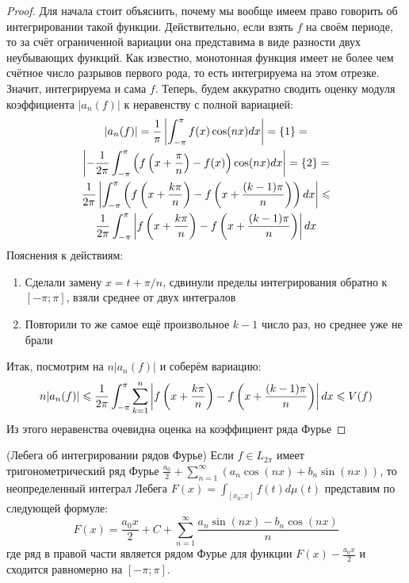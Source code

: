 \begin{proof}
	Для начала стоит объяснить, почему мы вообще имеем право говорить об интегрировании такой функции. Действительно, если взять $f$ на своём периоде, то за счёт ограниченной вариации она представима в виде разности двух неубывающих функций. Как известно, монотонная функция имеет не более чем счётное число разрывов первого рода, то есть интегрируема на этом отрезке. Значит, интегрируема и сама $f$. Теперь, будем аккуратно сводить оценку модуля коэффициента $|a_n(f)|$ к неравенству с полной вариацией:
	\begin{multline*}
		|a_n(f)| = \frac{1}{\pi}\left|\int_{-\pi}^\pi f(x)\cos(nx)dx\right| = \{1\} =
		\\
		\left|-\frac{1}{2\pi} \int_{-\pi}^\pi \left(f\left(x + \frac{\pi}{n}\right) - f(x)\right)\cos(nx)dx\right| = \{2\} =
		\\
		\frac{1}{2\pi} \left|\int_{-\pi}^\pi \left(f\left(x + \frac{k\pi}{n}\right) - f\left(x + \frac{(k - 1)\pi}{n}\right)\right)dx\right| \leqslant
		\\
		\frac{1}{2\pi} \int_{-\pi}^\pi \left|f\left(x + \frac{k\pi}{n}\right) - f\left(x + \frac{(k - 1)\pi}{n}\right)\right|dx
	\end{multline*}
	Пояснения к действиям:
	\begin{enumerate}
		\item Сделали замену $x = t + \pi / n$, сдвинули пределы интегрирования обратно к $[-\pi; \pi]$, взяли среднее от двух интегралов
		
		\item Повторили то же самое ещё произвольное $k - 1$ число раз, но среднее уже не брали
	\end{enumerate}
	Итак, посмотрим на $n|a_n(f)|$ и соберём вариацию:
	\[
		n|a_n(f)| \leqslant \frac{1}{2\pi} \int_{-\pi}^\pi \sum_{k = 1}^n \left|f\left(x + \frac{k\pi}{n}\right) - f\left(x + \frac{(k - 1)\pi}{n}\right)\right|dx \leqslant V(f)
	\]
	Из этого неравенства очевидна оценка на коэффициент ряда Фурье
\end{proof}

\begin{theorem} (Лебега об интегрировании рядов Фурье)
	Если $f \in L_{2\pi}$ имеет тригонометрический ряд Фурье $\frac{a_0}{2} + \sum_{n = 1}^\infty (a_n\cos(nx) + b_n\sin(nx))$, то неопределенный интеграл Лебега $F(x) = \int_{[x_0; x]} f(t)d\mu(t)$ представим по следующей формуле:
	\[
		F(x) = \frac{a_0x}{2} + C + \sum_{n = 1}^\infty \frac{a_n\sin(nx) - b_n\cos(nx)}{n}
	\]
	где ряд в правой части является рядом Фурье для функции $F(x) - \frac{a_0x}{2}$ и сходится равномерно на $[-\pi; \pi]$.
\end{theorem}

